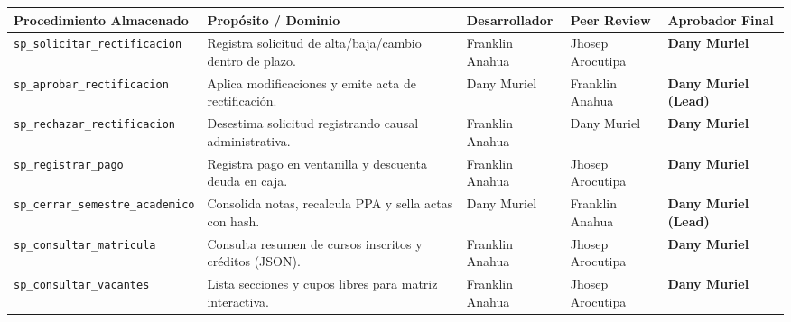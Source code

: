 \documentclass[11pt,a4paper]{article}
\begin{document}
\begin{longtable}{p{4.5cm} p{3.7cm} p{2.2cm} p{2.4cm} p{2.2cm}}
\toprule
\textbf{Procedimiento Almacenado} & \textbf{Propósito / Dominio} & \textbf{Desarrollador} & \textbf{Peer Review} & \textbf{Aprobador Final} \\
\midrule
\endhead
\texttt{sp\_solicitar\_rectificacion} & Registra solicitud de alta/baja/cambio dentro de plazo. & Franklin Anahua & Jhosep Arocutipa & \textbf{Dany Muriel} \\
\rowcolor{rowgray}
\texttt{sp\_aprobar\_rectificacion} & Aplica modificaciones y emite acta de rectificación. & Dany Muriel & Franklin Anahua & \textbf{Dany Muriel (Lead)} \\
\texttt{sp\_rechazar\_rectificacion} & Desestima solicitud registrando causal administrativa. & Franklin Anahua & Dany Muriel & \textbf{Dany Muriel} \\
\rowcolor{rowgray}
\texttt{sp\_registrar\_pago} & Registra pago en ventanilla y descuenta deuda en caja. & Franklin Anahua & Jhosep Arocutipa & \textbf{Dany Muriel} \\
\texttt{sp\_cerrar\_semestre\_academico} & Consolida notas, recalcula PPA y sella actas con hash. & Dany Muriel & Franklin Anahua & \textbf{Dany Muriel (Lead)} \\
\rowcolor{rowgray}
\texttt{sp\_consultar\_matricula} & Consulta resumen de cursos inscritos y créditos (JSON). & Franklin Anahua & Jhosep Arocutipa & \textbf{Dany Muriel} \\
\texttt{sp\_consultar\_vacantes} & Lista secciones y cupos libres para matriz interactiva. & Franklin Anahua & Jhosep Arocutipa & \textbf{Dany Muriel} \\
\bottomrule
\end{longtable}
\end{document}
